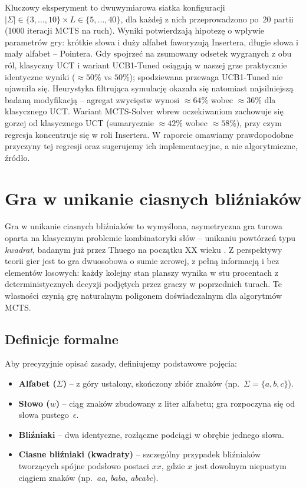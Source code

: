 \documentclass{article}
\begin{document}
Kluczowy eksperyment to dwuwymiarowa siatka konfiguracji
$|\Sigma|\in\{3,\dots,10\}\times L\in\{5,\dots,40\}$, dla każdej z nich
przeprowadzono po~20 partii (1000 iteracji MCTS na ruch). Wyniki potwierdzają
hipotezę o wpływie parametrów gry: krótkie słowa i duży alfabet faworyzują
Insertera, długie słowa i mały alfabet -- Pointera. Gdy spojrzeć na
zsumowany odsetek wygranych z obu ról, klasyczny UCT i wariant UCB1-Tuned
osiągają w naszej grze praktycznie identyczne wyniki ($\approx 50\%$ \mbox{vs}
$50\%$); spodziewana przewaga UCB1-Tuned nie ujawniła się. Heurystyka
filtrująca symulację okazała się natomiast najsilniejszą badaną
modyfikacją -- agregat zwycięstw wynosi $\approx 64\%$ wobec $\approx 36\%$
dla klasycznego UCT. Wariant MCTS-Solver wbrew oczekiwaniom zachowuje się
gorzej od klasycznego UCT (sumarycznie $\approx 42\%$ wobec $\approx 58\%$),
przy czym regresja koncentruje się w roli Insertera. W raporcie omawiamy
prawdopodobne przyczyny tej regresji oraz sugerujemy ich
implementacyjne, a nie algorytmiczne, źródło.
\newpage

\section{Gra w unikanie ciasnych bliźniaków}

Gra w unikanie ciasnych bliźniaków to wymyślona, asymetryczna gra turowa
oparta na klasycznym problemie kombinatoryki słów -- unikaniu powtórzeń
typu \emph{kwadrat}, badanym już przez Thuego na początku XX wieku
\cite{Thue1906,Lothaire2002}. Z perspektywy teorii gier jest to gra
dwuosobowa o sumie zerowej, z pełną informacją i bez elementów losowych:
każdy kolejny stan planszy wynika w stu procentach z deterministycznych
decyzji podjętych przez graczy w poprzednich turach. Te własności czynią
grę naturalnym poligonem doświadczalnym dla algorytmów MCTS.

\subsection{Definicje formalne}
Aby precyzyjnie opisać zasady, definiujemy podstawowe pojęcia:
\begin{itemize}
    \item \textbf{Alfabet ($\Sigma$)} -- z góry ustalony, skończony zbiór
    znaków (np.~$\Sigma=\{a,b,c\}$).
    \item \textbf{Słowo ($w$)} -- ciąg znaków zbudowany z liter alfabetu;
    gra rozpoczyna się od słowa pustego~$\epsilon$.
    \item \textbf{Bliźniaki} -- dwa identyczne, rozłączne podciągi w obrębie
    jednego słowa.
    \item \textbf{Ciasne bliźniaki (kwadraty)} -- szczególny przypadek
    bliźniaków tworzących spójne podsłowo postaci $xx$, gdzie $x$ jest
    dowolnym niepustym ciągiem znaków (np.~\textit{aa}, \textit{baba},
    \textit{abcabc}).
\end{itemize}
\end{document}
